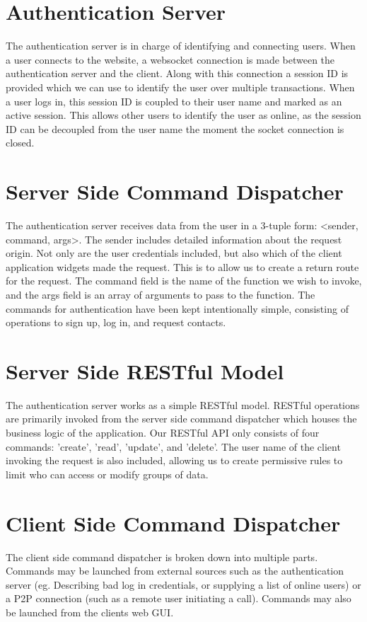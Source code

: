\documentclass[a4paper,12pt]{report}
\begin{document}
\section{Authentication Server}
The authentication server is in charge of identifying and connecting users. When a user connects to the website, a websocket connection is made between the authentication server and the client. Along with this connection a session ID is provided which we can use to identify the user over multiple transactions. When a user logs in, this session ID is coupled to their user name and marked as an active session. This allows other users to identify the user as online, as the session ID can be decoupled from the user name the moment the socket connection is closed.
\section{Server Side Command Dispatcher}
The authentication server receives data from the user in a 3-tuple form: <sender, command, args>. The sender includes detailed information about the request origin. Not only are the user credentials included, but also which of the client application widgets made the request. This is to allow us to create a return route for the request. The command field is the name of the function we wish to invoke, and the args field is an array of arguments to pass to the function. The commands for authentication have been kept intentionally simple, consisting of operations to sign up, log in, and request contacts. 
\section{Server Side RESTful Model}
The authentication server works as a simple RESTful model. RESTful operations are primarily invoked from the server side command dispatcher which houses the business logic of the application. Our RESTful API only consists of four commands: 'create', 'read', 'update', and 'delete'. The user name of the client invoking the request is also included, allowing us to create permissive rules to limit who can access or modify groups of data.
\section{Client Side Command Dispatcher}
The client side command dispatcher is broken down into multiple parts. Commands may be launched from external sources such as the authentication server (eg. Describing bad log in credentials, or supplying a list of online users) or a P2P connection (such as a remote user initiating a call). Commands may also be launched from the clients web GUI.
\end{document}
